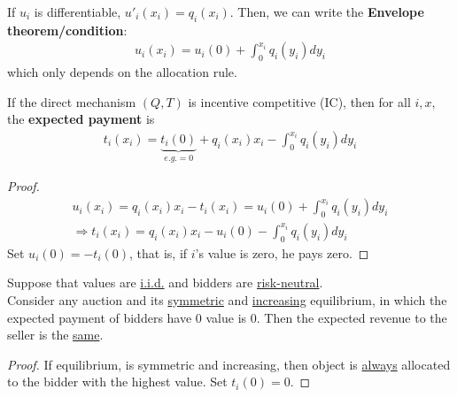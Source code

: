 \documentclass[11pt]{elegantbook}
\begin{document}
If $u_i$ is differentiable, $u'_i(x_i)=q_i(x_i)$. Then, we can write the \textbf{Envelope theorem/condition}:
\begin{equation}
    \begin{aligned}
        u_i(x_i)=u_i(0)+\int_0^{x_i} q_i(y_i)dy_i
    \end{aligned}
    \nonumber
\end{equation}
which only depends on the allocation rule.

\begin{theorem}
    If the direct mechanism $(Q,T)$ is incentive competitive (IC), then for all $i,x$, the \textbf{expected payment} is
    \begin{equation}
        \begin{aligned}
            t_i(x_i)=\underbrace{t_i(0)}_{e.g.=0}+q_i(x_i)x_i-\int_0^{x_i} q_i(y_i)dy_i
        \end{aligned}
        \nonumber
    \end{equation}
\end{theorem}
\begin{proof}
    \begin{equation}
        \begin{aligned}
            u_i(x_i)= q_i(x_i) x_i - t_i(x_i)=u_i(0)+\int_0^{x_i} q_i(y_i)dy_i\\
            \Rightarrow t_i(x_i)=q_i(x_i)x_i-u_i(0)-\int_0^{x_i} q_i(y_i)dy_i
        \end{aligned}
        \nonumber
    \end{equation}
    Set $u_i(0)=-t_i(0)$, that is, if $i$'s value is zero, he pays zero.
\end{proof}

\begin{corollary}
    Suppose that values are \underline{i.i.d.} and bidders are \underline{risk-neutral}.\\
    Consider any auction and its \underline{symmetric} and \underline{increasing} equilibrium, in which the expected payment of bidders have $0$ value is $0$. Then the expected revenue to the seller is the \underline{same}.
\end{corollary}
\begin{proof}
    If equilibrium, is symmetric and increasing, then object is \underline{always} allocated to the bidder with the highest value. Set $t_i(0)=0$.
\end{proof}
\end{document}
